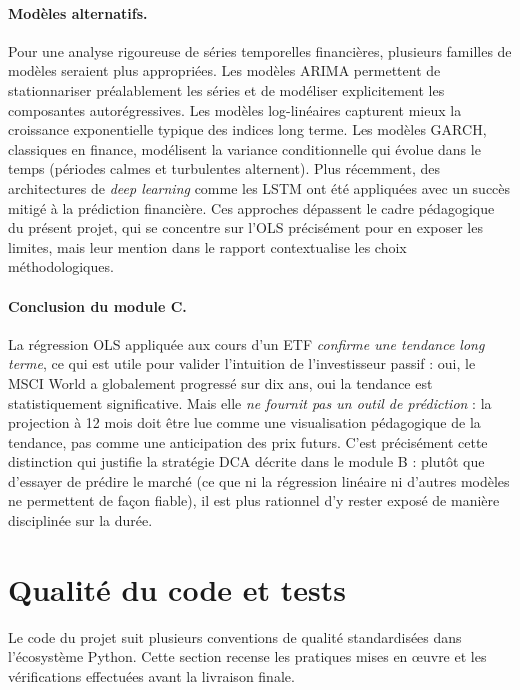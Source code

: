 \documentclass[11pt,a4paper]{article}
\begin{document}
\paragraph{Modèles alternatifs.}
Pour une analyse rigoureuse de séries temporelles financières,
plusieurs familles de modèles seraient plus appropriées. Les modèles
ARIMA permettent de stationnariser préalablement les séries et de
modéliser explicitement les composantes autorégressives. Les modèles
log-linéaires capturent mieux la croissance exponentielle typique des
indices long terme. Les modèles GARCH, classiques en finance,
modélisent la variance conditionnelle qui évolue dans le temps
(périodes calmes et turbulentes alternent). Plus récemment, des
architectures de \textit{deep learning} comme les LSTM ont été
appliquées avec un succès mitigé à la prédiction financière. Ces
approches dépassent le cadre pédagogique du présent projet, qui se
concentre sur l'OLS précisément pour en exposer les limites, mais leur
mention dans le rapport contextualise les choix méthodologiques.

\paragraph{Conclusion du module C.}
La régression OLS appliquée aux cours d'un ETF \textit{confirme une
tendance long terme}, ce qui est utile pour valider l'intuition de
l'investisseur passif : oui, le MSCI World a globalement progressé sur
dix ans, oui la tendance est statistiquement significative. Mais elle
\textit{ne fournit pas un outil de prédiction} : la projection à 12
mois doit être lue comme une visualisation pédagogique de la tendance,
pas comme une anticipation des prix futurs. C'est précisément cette
distinction qui justifie la stratégie DCA décrite dans le module B :
plutôt que d'essayer de prédire le marché (ce que ni la régression
linéaire ni d'autres modèles ne permettent de façon fiable), il est
plus rationnel d'y rester exposé de manière disciplinée sur la durée.

\section{Qualité du code et tests}
\label{sec:qualite}

Le code du projet suit plusieurs conventions de qualité standardisées
dans l'écosystème Python. Cette section recense les pratiques mises en
œuvre et les vérifications effectuées avant la livraison finale.
\end{document}

